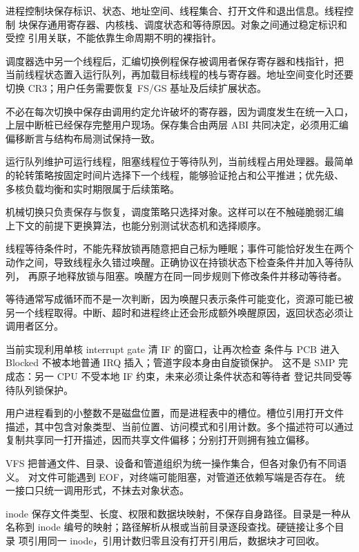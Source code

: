 进程控制块保存标识、状态、地址空间、线程集合、打开文件和退出信息。线程控制
块保存通用寄存器、内核栈、调度状态和等待原因。对象之间通过稳定标识和受控
引用关联，不能依靠生命周期不明的裸指针。

调度器选中另一个线程后，汇编切换例程保存被调用者保存寄存器和栈指针，把
当前线程状态置入运行队列，再加载目标线程的栈与寄存器。地址空间变化时还要
切换 CR3；用户任务需要恢复 FS/GS 基址及后续扩展状态。

不必在每次切换中保存由调用约定允许破坏的寄存器，因为调度发生在统一入口，
上层中断桩已经保存完整用户现场。保存集合由两层 ABI 共同决定，必须用汇编
偏移断言与结构布局测试保持一致。

运行队列维护可运行线程，阻塞线程位于等待队列，当前线程占用处理器。最简单
的轮转策略按固定时间片选择下一个线程，能够验证抢占和公平推进；优先级、
多核负载均衡和实时期限属于后续策略。

机械切换只负责保存与恢复，调度策略只选择对象。这样可以在不触碰脆弱汇编
上下文的前提下更换算法，也能分别测试状态机和选择顺序。

线程等待条件时，不能先释放锁再随意把自己标为睡眠；事件可能恰好发生在两个
动作之间，导致线程永久错过唤醒。正确协议在持锁状态下检查条件并加入等待队列，
再原子地释放锁与阻塞。唤醒方在同一同步规则下修改条件并移动等待者。

等待通常写成循环而不是一次判断，因为唤醒只表示条件可能变化，资源可能已被
另一个线程取得。中断、超时和进程终止还会形成额外唤醒原因，返回状态必须让
调用者区分。

当前实现利用单核  interrupt gate 清 IF 的窗口，让再次检查
条件与 PCB 进入 Blocked 不被本地普通 IRQ 插入；管道字段本身由自旋锁保护。
这不是 SMP 完成态：另一 CPU 不受本地 IF 约束，未来必须让条件状态和等待者
登记共同受等待队列锁保护。

用户进程看到的小整数不是磁盘位置，而是进程表中的槽位。槽位引用打开文件
描述，其中包含对象类型、当前位置、访问模式和引用计数。多个描述符可以通过
复制共享同一打开描述，因而共享文件偏移；分别打开则拥有独立偏移。

VFS 把普通文件、目录、设备和管道组织为统一操作集合，但各对象仍有不同语义。
 对文件可能遇到 EOF，对终端可能阻塞，对管道还依赖写端是否存在。
统一接口只统一调用形式，不抹去对象状态。

inode 保存文件类型、长度、权限和数据块映射，不保存自身路径。目录是一种从
名称到 inode 编号的映射；路径解析从根或当前目录逐段查找。硬链接让多个目录
项引用同一 inode，引用计数归零且没有打开引用后，数据块才可回收。

